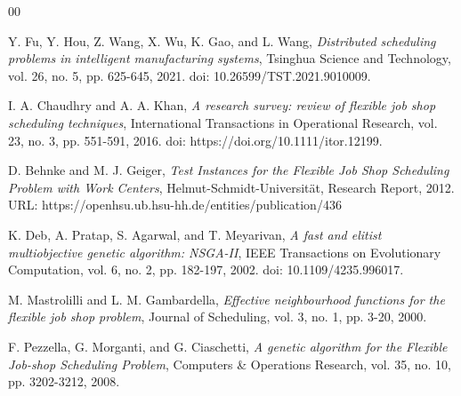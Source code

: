 \documentclass[preprint,12pt,authoryear]{elsarticle}
\begin{document}


\begin{thebibliography}{00}


Y. Fu, Y. Hou, Z. Wang, X. Wu, K. Gao, and L. Wang, 
\textit{Distributed scheduling problems in intelligent manufacturing systems}, 
Tsinghua Science and Technology, vol. 26, no. 5, pp. 625-645, 2021.
doi: 10.26599/TST.2021.9010009.

I. A. Chaudhry and A. A. Khan, 
\textit{A research survey: review of flexible job shop scheduling techniques}, 
International Transactions in Operational Research, vol. 23, no. 3, pp. 551-591, 2016. 
doi: https://doi.org/10.1111/itor.12199.

D. Behnke and M. J. Geiger,
\textit{Test Instances for the Flexible Job Shop Scheduling Problem with Work Centers},
Helmut-Schmidt-Universität, Research Report, 2012.
URL: https://openhsu.ub.hsu-hh.de/entities/publication/436

K. Deb, A. Pratap, S. Agarwal, and T. Meyarivan,
\textit{A fast and elitist multiobjective genetic algorithm: NSGA-II},
IEEE Transactions on Evolutionary Computation, vol. 6, no. 2, pp. 182-197, 2002.
doi: 10.1109/4235.996017.

M. Mastrolilli and L. M. Gambardella,
\textit{Effective neighbourhood functions for the flexible job shop problem},
Journal of Scheduling, vol. 3, no. 1, pp. 3-20, 2000.

F. Pezzella, G. Morganti, and G. Ciaschetti,
\textit{A genetic algorithm for the Flexible Job-shop Scheduling Problem},
Computers \& Operations Research, vol. 35, no. 10, pp. 3202-3212, 2008.

\end{thebibliography}
\end{document}
